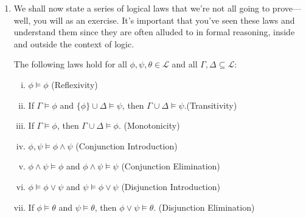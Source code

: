 \begin{enumerate}[\thesection.1]
\begin{proof}
		\end{proof}
The concept of equivalence is of fundamental importance for logical theory. To see this, note that all that matters for validity is the truth or falsity of statements: an inference is valid iff in every model where the premises are true, so is the conclusion. But then, if two statements are logically equivalent, they can be replaced for each other in all reasoning contexts without destroying validity: if an inference is valid, then so is any inference where some formulas have been replaced with logically equivalent ones. For example, since $p,q\therefore p\land q$ is valid, so is $\neg\neg p,q\therefore p\land q$.

		\item We shall now state a series of logical laws that we're not all going to prove---well, you will as an exercise. It's important that you've seen these laws and understand them since they are often alluded to in formal reasoning, inside and outside the context of logic. 
		
		\begin{lemma}
		The following laws hold for all $\phi,\psi,\theta\in\mathcal{L}$ and all $\Gamma,\Delta\subseteq\mathcal{L}$:
		
			\begin{enumerate}[(i)]
			
				\item $\phi\vDash \phi$ \hfill (Reflexivity)
				
				\item If $\Gamma\vDash\phi$ and $\{\phi\}\cup\Delta\vDash\psi$, then $\Gamma\cup\Delta\vDash\psi$.\hfill (Transitivity)
			
				\item If $\Gamma\vDash\phi$, then $\Gamma\cup\Delta\vDash\phi$. \hfill(Monotonicity)
				
				\item $\phi,\psi\vDash\phi\land \psi$ \hfill(Conjunction Introduction)
				
				\item $\phi\land\psi\vDash\phi$ and $\phi\land\psi\vDash\psi$ \hfill (Conjunction Elimination)
				
				\item $\phi\vDash\phi\lor\psi$ and $\psi\vDash\phi\lor \psi$ \hfill (Disjunction Introduction)
				
				\item If $\phi\vDash\theta$ and $\psi\vDash\theta$, then $\phi\lor\psi\vDash\theta$. \hfill (Disjunction Elimination)
				

\end{enumerate}
\end{lemma}
\end{enumerate}
